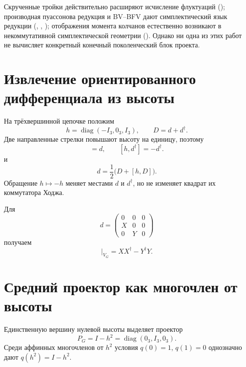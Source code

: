 Скрученные тройки действительно расширяют исчисление флуктуаций
(); производная пуассонова редукция и BV--BFV дают
симплектический язык редукции (,
, ); отображения момента
колчанов естественно возникают в некоммутативной симплектической геометрии
(). Однако ни одна из этих работ не вычисляет
конкретный конечный поколенческий блок проекта.

\section{Извлечение ориентированного дифференциала из высоты}

На трёхвершинной цепочке положим
\begin{equation}
 h=\operatorname{diag}(-I_3,0_3,I_3),\qquad D=d+d^\dagger.
\end{equation}
Две направленные стрелки повышают высоту на единицу, поэтому
\begin{equation}
 [h,d]=d,\qquad[h,d^\dagger]=-d^\dagger.
\end{equation}
и
\begin{equation}
 \boxed{d=\frac12\bigl(D+[h,D]\bigr).}
 \label{eq:v5-height-oriented-differential}
\end{equation}
Обращение \(h\mapsto-h\) меняет местами \(d\) и \(d^\dagger\), но не
изменяет квадрат их коммутатора Ходжа.

Для
\begin{equation}
 d=\begin{pmatrix}0&0&0\\X&0&0\\0&Y&0\end{pmatrix}
\end{equation}
получаем
\begin{equation}
 [d,d^\dagger]\big|_{V_G}=XX^\dagger-Y^\dagger Y.
 \label{eq:v5-height-middle-moment-map}
\end{equation}

\section{Средний проектор как многочлен от высоты}

Единственную вершину нулевой высоты выделяет проектор
\begin{equation}
 \boxed{P_G=I-h^2=\operatorname{diag}(0_3,I_3,0_3).}
 \label{eq:v5-height-middle-projector}
\end{equation}
Среди аффинных многочленов от \(h^2\) условия \(q(0)=1\), \(q(1)=0\)
однозначно дают \(q(h^2)=I-h^2\).

